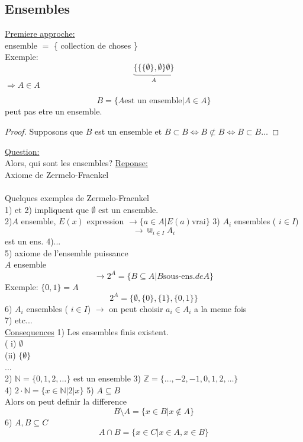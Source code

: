 \documentclass[../main.tex]{subfiles}
\begin{document}
\subsection{Ensembles}
\underline{Premiere approche:}\\
ensemble $=$ \{ collection de choses \}\\
Exemple:\\
\[ 
	\underbrace{ \{\{ \{\emptyset\}, \emptyset \}\emptyset\} }_{A}
\]
$\Rightarrow A \in A$ 
\begin{propo}\label{propo:paradoxe_de_russel}
\[ 
	B = \{ A \text{est un ensemble} \vert A \in A\}
\]
peut pas etre un ensemble.
\end{propo}
\begin{proof}
Supposons que $B$ est un ensemble et $B \subset B \iff B \not\subset B \iff B \subset B \ldots$ 
\end{proof}
\underline{Question:}\\
Alors, qui sont les ensembles?
\underline{Reponse:}\\
Axiome de Zermelo-Fraenkel\\
\hr\\
Quelques exemples de Zermelo-Fraenkel\\
1) et 2) impliquent que $\emptyset$ est un ensemble.\\
2)$A$ ensemble, $E(x)$ expression
$\rightarrow \{a \in A \vert E(a) \text{vrai}\}$
3) $A_i$ ensembles ( $i \in I$)\\
\[ 
	\rightarrow \Cup_{i\in I}  A_i
\]
est un ens.
4)...\\
5) axiome de l'ensemble puissance\\
$A$ ensemble
\[ 
	\rightarrow 2^{A} = \{ B \subseteq A \vert B \text{sous-ens.} de A\}
\]
Exemple: $\{0,1\}=A$ \\

\[ 
	2^{A} = \{ \emptyset , \{0\}, \{1\}, \{0,1\}\}
\]
6) $A_i$ ensembles ( $i \in I$)
$\rightarrow$ on peut choisir $a_i \in A_i$ a la meme fois\\
7) etc...\\
\underline{Consequences}
1) Les ensembles finis existent.\\
( i)  $\emptyset$ \\
 (ii)  $\{\emptyset\}$ \\
 ...\\

 2) $\mathbb{N} = \{0,1,2,\ldots\}$ est un ensemble
 3) $\mathbb{Z}= \{\ldots,-2,-1,0,1,2,\ldots\}$\\
 4) $2 \cdot \mathbb{N} = \{x \in \mathbb{N} \vert 2 \vert x\}$
 5) $A \subseteq B$ \\
 Alors on peut definir la difference
 \[ 
	 B \setminus A = \{x \in B \vert x \not\in A\}
 \]
 6) $A,B \subseteq C$ 
 \[ 
	 A \cap B = \{x \in C \vert x \in A, x \in B\} 
 \]
 
 
\end{document}
